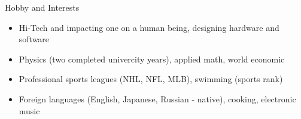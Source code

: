\documentclass{resume}
\begin{document}

\begin{rSection}{Hobby and Interests}

\begin{itemize}
\item Hi-Tech and impacting one on a human being, designing hardware and software
\item Physics (two completed univercity years), applied math, world economic
\item Professional sports leagues (NHL, NFL, MLB), swimming (sports rank)
\item Foreign languages (English, Japanese, Russian - native), cooking, electronic music
\end{itemize}

\end{rSection}

\end{document}
